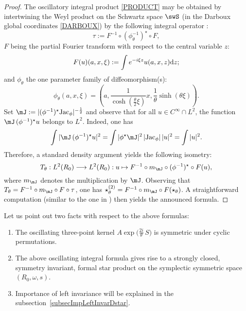 \begin{proof}
The oscillatory integral product \eqref{PRODUCT} may be obtained by intertwining the Weyl product on the Schwartz space $\swS$ (in the Darboux global coordinates \eqref{DARBOUX}) by the following integral operator \cite{Biel-Massar}:
\begin{equation*}
\tau:=F ^{-1}\circ(\phi_\theta^{-1})^\star\circ F,
\end{equation*}
$F $ being the partial Fourier transform with respect to        the central variable $z$:
\begin{equation*}
F (u)(a,x,\xi):=\int e^{-i\xi z}u(a,x,z){\rm d}z;
\end{equation*}
and $\phi_\theta$ the one parameter family of diffeomorphism(s):
\begin{equation*}
\phi_\theta(a,x,\xi)=(a,\frac{1}{\cosh(\frac{\theta}{2}\xi)}x,
\frac{1}{\theta}\sinh(\theta\xi)).
\end{equation*}
Set $\mJ:=|(\phi^{-1})^\star\mbox{Jac}_\phi|^{-\frac{1}{2}}$ and observe that for all $u\in C^\infty\cap L^2$, the function $\mJ\,(\phi^{-1})^\star u$ belongs to $L^2$.  Indeed, one has
\begin{equation*}
\int|\mJ\,(\phi^{-1})^\star u|^2=\int|\phi^\star \mJ|^2\,|\mbox{Jac}_\phi|\,|u|^2=\int|u|^2.
\end{equation*}
Therefore, a standard density argument yields the following isometry:
\begin{equation*}
T_\theta:L^2(R_0)\longrightarrow L^2(R_0):
u\mapsto F ^{-1}\circ m_\mJ\circ(\phi^{-1})^\star\circ F (u),
\end{equation*}
where  $m_{\mJ}$ denotes the multiplication by $\mJ$.  Observing that $T_\theta=F ^{-1}\circ m_{\mJ}\circ F \circ\tau$, one has $\star^{(2)}_\theta=F ^{-1}\circ m_{\mJ}\circ F (\star_\theta)$.  A straightforward computation (similar to the one in \cite{StrictSolvableSym})     then yields the announced formula.
\end{proof}

Let us point out two facts with respect to the above formulas:
\begin{enumerate}
\item The oscillating three-point kernel $A\exp \big (\frac{2i}{\theta}\,S\big)$ is symmetric under cyclic permutations.
\item The above oscillating integral formula gives rise to a strongly closed, symmetry invariant, formal star product on the symplectic symmetric space $(R_0,\omega,s)$.
\item
    Importance of left invariance will be explained in the subsection~\ref{subsecImpLeftInvarDstar}.
\end{enumerate}

